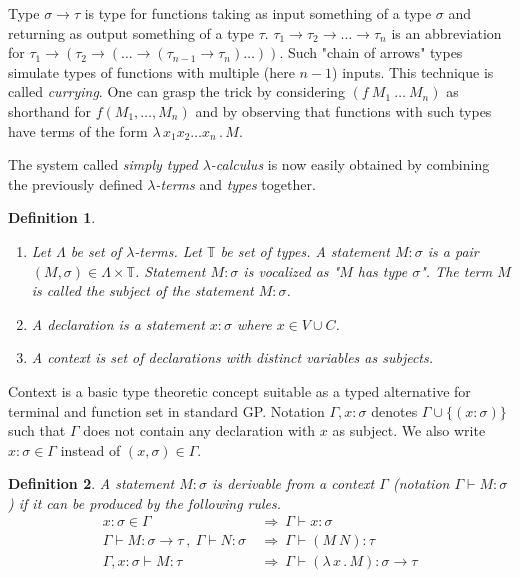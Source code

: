 \documentclass[conference]{IEEEtran}
\newtheorem{definition}{Definition}
\newcommand{\lterms}{$\lambda$-terms\xspace}
\newcommand{\tur}[3]{#1\vdash{}#2 \colon #3}
\newcommand{\then}{\Rightarrow\xspace}
\newcommand{\lamb}[2]{( \lambda \, #1 \, . \, #2 )}
\newcommand{\lam}[2]{\lambda \, #1 \, . \, #2}
\newcommand{\ar}{\rightarrow\xspace}
\begin{document}
Type $\sigma \ar \tau$ is type for functions taking as input
something of a type $\sigma$ and returning 
as output something of a type $\tau$. 
$\tau_1 \ar \tau_2 \ar \dots \ar \tau_n$ is an abbreviation for 
$\tau_1 \ar (\tau_2 \ar (\dots \ar (\tau_{n-1} \ar \tau_n)\dots))$. Such "chain of arrows" types simulate types of functions with multiple (here $n-1$) inputs. 
This technique is called \textit{currying}. One can grasp the trick by considering $(f~M_1~\dots~M_n)$ as shorthand for $f(M_1,\dots,M_n)$
and by observing that functions with such types have terms of the form $\lam{x_1 x_2 \dots x_n }{M}$. 


The system called \textit{simply typed $\lambda$-calculus} is now easily obtained by combining the previously defined \textit{\lterms} and \textit{types} together. 

\begin{definition}~

\begin{enumerate}
 \item 	Let $\Lambda$ be set of {\it \lterms}. 
	Let $\mathbb{T}$ be set of {\it types}.       
	A {\it statement} $M : \sigma$ is a pair 
	$(M,\sigma) \in \Lambda \times \mathbb{T}$.
	Statement $M : \sigma$ is vocalized as 
	{\it "$M$ has type $\sigma$"}.
	The term $M$ is called the {\it subject} of the 
	statement $M : \sigma$.
 \item A \textit{declaration} is a statement 
 $x : \sigma$ where $x \in V \cup C$.
  
 \item A \textit{context} 
 is set of declarations with distinct variables as subjects.
\end{enumerate}
\end{definition}



Context is a basic type theoretic concept suitable as a typed alternative
for terminal and function set in standard GP. 
Notation $\Gamma,x:\sigma $ denotes $ \Gamma\cup\{(x:\sigma)\}$ 
such that $\Gamma$ does not contain any declaration with $x$ as subject.
We also write $x:\sigma \in \Gamma$ instead of $(x,\sigma) \in \Gamma$.


\begin{definition}
A statement $M\colon\sigma$ is \textit{derivable from}
a context $\Gamma$ (notation 
\mbox{$\Gamma\vdash{}M\colon\sigma$}) 
if it can be produced by the following rules.
\begin{align*}
x : \sigma \in \Gamma &~\then~ \tur{\Gamma}{x}{\sigma}\\
\tur{\Gamma}{M}{\sigma \ar \tau}~,~\tur{\Gamma}{N}{\sigma} 
&~\then~ \tur{\Gamma}{(M~N)}{\tau}\\  
\tur{\Gamma,x:\sigma}{M}{\tau}
&~\then~ \tur{\Gamma}{\lamb{x}{M}}{\sigma \ar \tau} 
\end{align*}
\end{definition}
\end{document}
